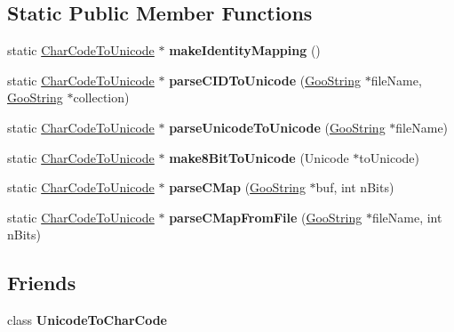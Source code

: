 \subsection*{Static Public Member Functions}
\begin{DoxyCompactItemize}
\item 
\mbox{\label{class_char_code_to_unicode_a1e87bbe81de840375155df919c752003}} 
static \hyperlink{class_char_code_to_unicode}{Char\+Code\+To\+Unicode} $\ast$ {\bfseries make\+Identity\+Mapping} ()
\item 
\mbox{\label{class_char_code_to_unicode_ad9eadd8367b2904d7ec1fa9e93fc668c}} 
static \hyperlink{class_char_code_to_unicode}{Char\+Code\+To\+Unicode} $\ast$ {\bfseries parse\+C\+I\+D\+To\+Unicode} (\hyperlink{class_goo_string}{Goo\+String} $\ast$file\+Name, \hyperlink{class_goo_string}{Goo\+String} $\ast$collection)
\item 
\mbox{\label{class_char_code_to_unicode_a942ea863558c48d58a936483f83aa0f2}} 
static \hyperlink{class_char_code_to_unicode}{Char\+Code\+To\+Unicode} $\ast$ {\bfseries parse\+Unicode\+To\+Unicode} (\hyperlink{class_goo_string}{Goo\+String} $\ast$file\+Name)
\item 
\mbox{\label{class_char_code_to_unicode_a67d1156e828e9a70a62dd494651dcdb8}} 
static \hyperlink{class_char_code_to_unicode}{Char\+Code\+To\+Unicode} $\ast$ {\bfseries make8\+Bit\+To\+Unicode} (Unicode $\ast$to\+Unicode)
\item 
\mbox{\label{class_char_code_to_unicode_afde38f970d74bca53f46e77385c0e109}} 
static \hyperlink{class_char_code_to_unicode}{Char\+Code\+To\+Unicode} $\ast$ {\bfseries parse\+C\+Map} (\hyperlink{class_goo_string}{Goo\+String} $\ast$buf, int n\+Bits)
\item 
\mbox{\label{class_char_code_to_unicode_a94062af981ab31ee721dc6369c9117db}} 
static \hyperlink{class_char_code_to_unicode}{Char\+Code\+To\+Unicode} $\ast$ {\bfseries parse\+C\+Map\+From\+File} (\hyperlink{class_goo_string}{Goo\+String} $\ast$file\+Name, int n\+Bits)
\end{DoxyCompactItemize}
\subsection*{Friends}
\begin{DoxyCompactItemize}
\item 
\mbox{\label{class_char_code_to_unicode_a697964e520ec3fd1f9e77731df1b818b}} 
class {\bfseries Unicode\+To\+Char\+Code}
\end{DoxyCompactItemize}


